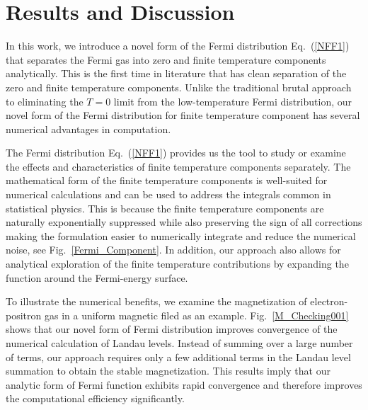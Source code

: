 \documentclass[sn-mathphys,Numbered]{sn-jnl}
\begin{document}


\section{Results and Discussion}
\label{sec12}
In this work, we introduce a novel form of the Fermi distribution Eq.~(\ref{NFF1}) that separates the Fermi gas into zero and finite temperature components analytically. This is the first time in literature that has clean separation of the zero and finite temperature components. Unlike the traditional brutal approach to eliminating the $T=0$ limit from the low-temperature Fermi distribution, our novel form of the Fermi distribution for finite temperature component has several numerical advantages in computation. 

The Fermi distribution Eq.~(\ref{NFF1}) provides us the tool to study or examine the effects and characteristics of finite temperature components separately. The mathematical form of the finite temperature components is well-suited for numerical calculations and can be used to address the integrals common in statistical physics. This is because the finite temperature components are naturally exponentially suppressed while also preserving the sign of all corrections making the formulation easier to numerically integrate and reduce the numerical noise, see Fig.~\ref{Fermi_Component}. In addition, our approach also allows for analytical exploration of the finite temperature contributions by expanding the function around the Fermi-energy surface.

To illustrate the numerical benefits, we examine the magnetization of electron-positron gas in a uniform magnetic filed as an example. Fig.~\ref{M_Checking001} shows that our novel form of Fermi distribution improves convergence of the numerical calculation of Landau levels. Instead of summing over a large number of terms, our approach  requires only a few additional terms in the Landau level summation to obtain the stable magnetization. This results imply that our analytic form of Fermi function exhibits rapid convergence and therefore improves the computational efficiency significantly.



\end{document}
